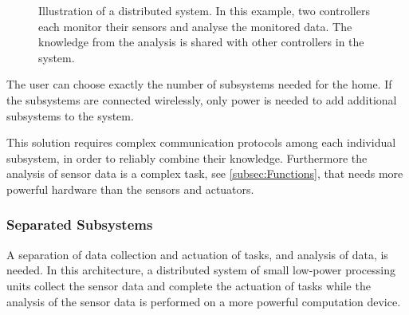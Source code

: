 \begin{figure}[htbp]
\centering
{}
\caption{Illustration of a distributed system. In this example, two controllers each monitor their sensors and analyse the monitored data. The knowledge from the analysis is shared with other controllers in the system.}\label{fig:distributed_system}
\end{figure}

The user can choose exactly the number of subsystems needed for the home. If the subsystems are connected wirelessly, only power is needed to add additional subsystems to the system.

This solution requires complex communication protocols among each individual subsystem, in order to reliably combine their knowledge. Furthermore the analysis of sensor data is a complex task, see \cref{subsec:Functions}, that needs more powerful hardware than the sensors and actuators.

\subsubsection{Separated Subsystems}
A separation of data collection and actuation of tasks, and analysis of data, is needed. In this architecture, a distributed system of small low-power processing units collect the sensor data and complete the actuation of tasks while the analysis of the sensor data is performed on a more powerful computation device.

